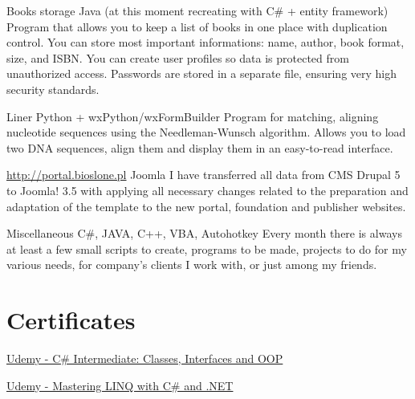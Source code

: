 {\begin{template}
            \templateZeroIndent 
            {Books storage}
            {Java (at this moment recreating with C\# + entity framework)}
            {
                Program that allows you to keep a list of books in one place with duplication control. You can store most important informations: name, author, book format, size, and ISBN. You can create user profiles so data is protected from unauthorized access. Passwords are stored in a separate file, ensuring very high security standards.
            }
            
            \templateZeroIndent 
            {Liner}
            {Python + wxPython/wxFormBuilder}
            {
                Program for matching, aligning nucleotide sequences using the Needleman-Wunsch algorithm. Allows you to load two DNA sequences, align them and display them in an easy-to-read interface.
            }
            
            \templateZeroIndent
            {\href{http://portal.bioslone.pl}{http://portal.bioslone.pl}}
            {Joomla}
            {
                I have transferred all data from CMS Drupal 5 to Joomla! 3.5 with applying all necessary changes related to the preparation and adaptation of the template to the new portal, foundation and publisher websites.
            }
            
            \templateZeroIndent 
            {Miscellaneous}
            {C\#, JAVA, C++, VBA, Autohotkey}
            {
                Every month there is always at least a few small scripts to create, programs to be made, projects to do for my various needs, for company's clients I work with, or just among my friends.
            }
        \end{template}
        
    \section{Certificates}
        \begin{template}
                {\href{https://www.udemy.com/csharp-intermediate-classes-interfaces-and-oop/\#curriculum}{Udemy - C\# Intermediate: Classes, Interfaces and OOP}}
                {\relax}
                {\relax}
                
                {\href{https://www.udemy.com/linqlinq/learn/v4/content}{Udemy - Mastering LINQ with C\# and .NET}}
                {\relax}
                {\relax}
            
        \end{template}
}